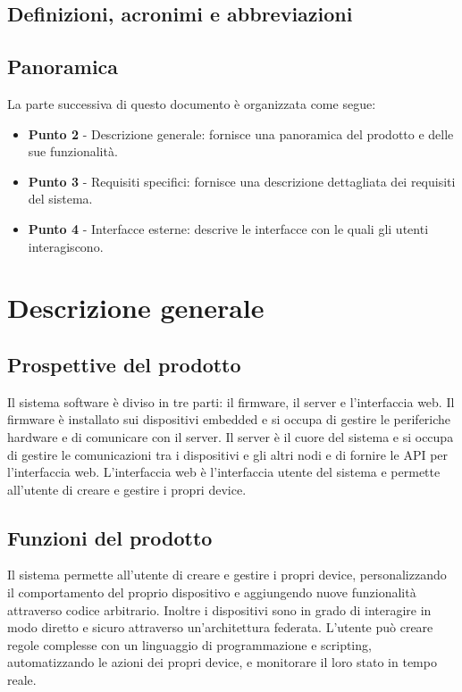 \subsection{Definizioni, acronimi e abbreviazioni}


\subsection{Panoramica}

La parte successiva di questo documento è organizzata come segue:
\begin{itemize}
    \item \textbf{Punto 2} - Descrizione generale: fornisce una panoramica del prodotto e delle sue funzionalità.
    \item \textbf{Punto 3} - Requisiti specifici: fornisce una descrizione dettagliata dei requisiti del sistema.
    \item \textbf{Punto 4} - Interfacce esterne: descrive le interfacce con le quali gli utenti interagiscono.
\end{itemize}

\section{Descrizione generale}

\subsection{Prospettive del prodotto}

Il sistema software è diviso in tre parti: il firmware, il server e l'interfaccia web.
Il firmware è installato sui dispositivi embedded e si occupa di gestire le periferiche 
hardware e di comunicare con il server. Il server è il cuore del sistema e si occupa di
gestire le comunicazioni tra i dispositivi e gli altri nodi e di fornire le API per l'interfaccia web.
L'interfaccia web è l'interfaccia utente del sistema e permette all'utente di creare e gestire i propri device.

\subsection{Funzioni del prodotto}

Il sistema permette all'utente di creare e gestire i propri device, personalizzando il comportamento
del proprio dispositivo e aggiungendo nuove funzionalità attraverso codice arbitrario.
Inoltre i dispositivi sono in grado di interagire in modo diretto e sicuro attraverso un'architettura federata.
L'utente può creare regole complesse con un linguaggio di programmazione e scripting,
automatizzando le azioni dei propri device, e monitorare il loro stato in tempo reale.

